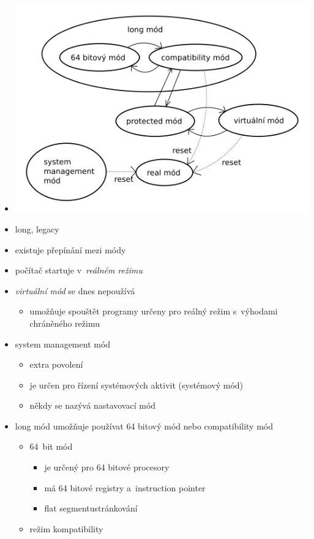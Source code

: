 \documentclass[a4paper,12pt]{article}
\providecommand{\tightlist}{%
\setlength{\itemsep}{0pt}\setlength{\parskip}{0pt}}
\begin{document}
\begin{itemize}
\tightlist
\item[] \includegraphics[width=13.704cm]{ref/mody.png}
\item long, legacy
\item existuje přepínání mezi módy
\item počítač startuje v~\emph{reálném režimu}
\item \emph{virtuální mód} se dnes nepoužívá

  \begin{itemize}
  \tightlist
  \item umožňuje spouštět programy určeny pro reálný režim s~výhodami
    chráněného režimu
  \end{itemize}
\item system management mód

  \begin{itemize}
  \tightlist
  \item extra povolení
  \item je určen pro řízení systémových aktivit (systémový mód)
  \item někdy se nazývá nastavovací mód
  \end{itemize}
\item long mód umožňuje používat 64 bitový mód nebo compatibility mód

  \begin{itemize}
    \tightlist
  \item 64~bit mód

    \begin{itemize}
    \tightlist
    \item je určený pro 64 bitové procesory
    \item má 64 bitové registry a~instruction pointer
    \item flat segmentustránkování
    \end{itemize}
  \item režim kompatibility


\end{itemize}
\end{itemize}
\end{document}
